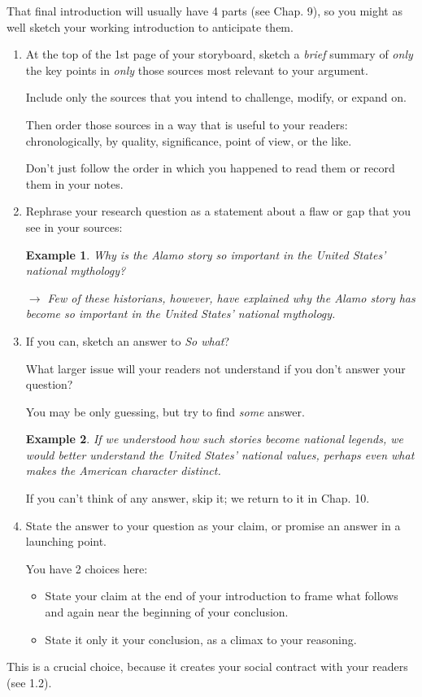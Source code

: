 \documentclass[oneside]{book}
\numberwithin{equation}{section}
\newtheorem{example}{Example}[section]
\begin{document}
That final introduction will usually have 4 parts (see Chap. 9), so you might as well sketch your working introduction to anticipate them.
\begin{enumerate}
    \item At the top of the 1st page of your storyboard, sketch a \textit{brief} summary of \textit{only} the key points in \textit{only} those sources most relevant to your argument.
    
    Include only the sources that you intend to challenge, modify, or expand on.
    
    Then order those sources in a way that is useful to your readers: chronologically, by quality, significance, point of view, or the like.
    
    Don't just follow the order in which you happened to read them or record them in your notes.
    \item Rephrase your research question as a statement about a flaw or gap that you see in your sources:
    \begin{example}
        Why is the Alamo story so important in the United States' national mythology?
        
        $\to$ Few of these historians, however, have explained why the Alamo story has become so important in the United States' national mythology.
    \end{example}
    \item If you can, sketch an answer to \textit{So what}?
    
    What larger issue will your readers not understand if you don't answer your question?
    
    You may be only guessing, but try to find \textit{some} answer.
    \begin{example}
        If we understood how such stories become national legends, we would better understand the United States' national values, perhaps even what makes the American character distinct.
    \end{example}
    If you can't think of any answer, skip it; we return to it in Chap. 10.
    \item State the answer to your question as your claim, or promise an answer in a launching point.
    
    You have 2 choices here:
    \begin{itemize}
        \item State your claim at the end of your introduction to frame what follows and again near the beginning of your conclusion.
        \item State it only it your conclusion, as a climax to your reasoning.
    \end{itemize}
\end{enumerate}
This is a crucial choice, because it creates your social contract with your readers (see 1.2).
\end{document}
